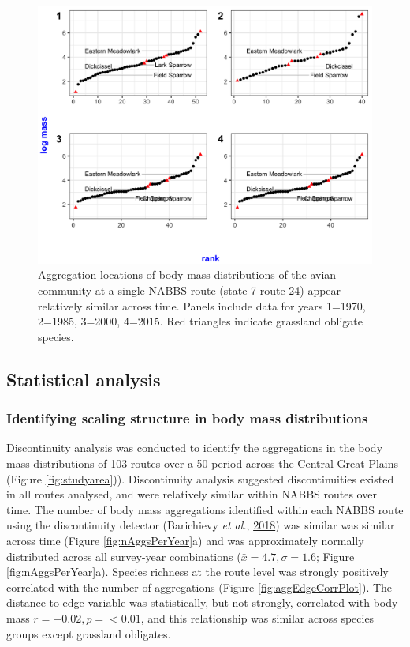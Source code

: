 \documentclass[print]{nuthesis}
\begin{document}
\begin{figure}
\includegraphics[width=0.85\linewidth]{.//chapterFiles/discontinuityAnalysis/figsCalledInDiss/routeGapEx} \caption{Aggregation locations of body mass distributions of the avian community at a single NABBS route (state 7 route 24) appear relatively similar across time. Panels include data for years 1=1970, 2=1985, 3=2000, 4=2015. Red triangles indicate grassland obligate species.}\label{fig:routeGapEx}
\end{figure}
\hypertarget{statistical-analysis-1}{%
\subsection{Statistical analysis}\label{statistical-analysis-1}}

\hypertarget{identifying-scaling-structure-in-body-mass-distributions}{%
\subsubsection{Identifying scaling structure in body mass distributions}\label{identifying-scaling-structure-in-body-mass-distributions}}

Discontinuity analysis was conducted to identify the aggregations in the body mass distributions of 103 routes over a 50 period across the Central Great Plains (Figure \ref{fig:studyarea})). Discontinuity analysis suggested discontinuities existed in all routes analysed, and were relatively similar within NABBS routes over time. The number of body mass aggregations identified within each NABBS route using the discontinuity detector (Barichievy \emph{et al.}, \protect\hyperlink{ref-barichievy2018method}{2018}) was similar was similar across time (Figure \ref{fig:nAggsPerYear}a) and was approximately normally distributed across all survey-year combinations (\(\bar{x} = 4.7, \sigma = 1.6\); Figure \ref{fig:nAggsPerYear}a). Species richness at the route level was strongly positively correlated with the number of aggregations (Figure \ref{fig:aggEdgeCorrPlot}). The distance to edge variable was statistically, but not strongly, correlated with body mass \(r=-0.02, p = <0.01\), and this relationship was similar across species groups except grassland obligates.
\end{document}
